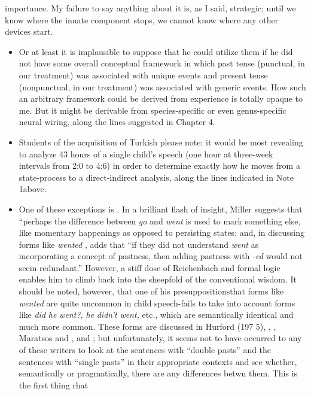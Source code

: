 \begin{itemize}
\begin{itemize}
\begin{itemize}
\begin{itemize}

importance. My failure to say anything about it is, as I said, strategic; until we know where the innate component stops, we cannot know where any other devices start.

\begin{itemize}
\item Or at least it is implausible to suppose that he could utilize them if he did not have some overall conceptual framework in which past tense (punctual, in our treatment) was associated with unique events and present tense (nonpunctual, in our treatment) was associ\-ated with generic events. How such an arbitrary framework could be derived from experience is totally opaque to me. But it might be derivable from species-specific or even genus-specific neural wiring, along the lines suggested in Chapter 4.
\item Students of the acquisition of Turkish please note: it would be most revealing to analyze 43 hours of a single child's speech (one hour at three-week intervals from 2:0 to 4:6) in order to determine exactly how he moves from a state-process to a direct-indirect analysis, along the lines indicated in Note 1above.
\item One of these exceptions is \citet{Miller1978}. In a brilliant flash of insight, Miller suggests that ``perhaps the difference between \textit{go} and \textit{went} is used to mark something else, like momentary happen\-ings as opposed to persisting states{\textquotedbl}; and, in discussing forms like \textit{wented} , adds that ``if they did not understand \textit{went} as incorporating a concept of pastness, then adding pastness with \textit{{}-ed} would not seem redundant.'' However, a stiff dose of Reichenbach and formal logic enables him to climb back into the sheepfold of the conventional wisdom. It should be noted, however, that one of his presuppositions\-that forms like \textit{wented} are quite uncommon in child speech-fails to take into account forms like \textit{did} \textit{he} \textit{went?,} \textit{he} \textit{didn't} \textit{went,} etc., which are semantically identical and much more common. These forms are discussed in Hurford (197 5), \citet{Kuczaj1976}, \citet{Fay1978}, Maratsos and \citet{Kuczaj1978}, and \citet{ErreichEtAl1980}; but unfortunately, it seems not to have occurred to any of these writers to look at the sentences with ``double pasts'' and the sentences with ``single pasts'' in their appropriate contexts and see whether, semantically or pragmatically, there are any differences betwn them. This is the first thing rhat
\end{itemize}


\end{itemize}
\end{itemize}
\end{itemize}
\end{itemize}
